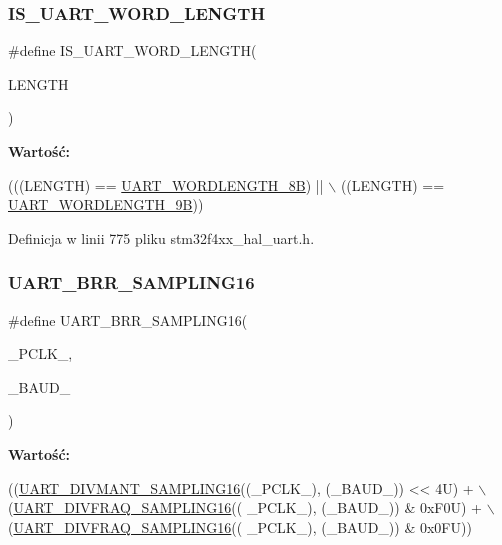 \subsubsection{\texorpdfstring{I\+S\+\_\+\+U\+A\+R\+T\+\_\+\+W\+O\+R\+D\+\_\+\+L\+E\+N\+G\+TH}{IS\_UART\_WORD\_LENGTH}}
{\footnotesize\ttfamily \#define I\+S\+\_\+\+U\+A\+R\+T\+\_\+\+W\+O\+R\+D\+\_\+\+L\+E\+N\+G\+TH(\begin{DoxyParamCaption}\item[{}]{L\+E\+N\+G\+TH }\end{DoxyParamCaption})}

{\bfseries Wartość\+:}
\begin{DoxyCode}
(((LENGTH) == \hyperlink{group___u_a_r_t___word___length_gaf394e9abaf17932ee89591f990fe6407}{UART\_WORDLENGTH\_8B}) || \(\backslash\)
                                     ((LENGTH) == \hyperlink{group___u_a_r_t___word___length_gaf867be43de35fd3c32fe0b4dd4058f7e}{UART\_WORDLENGTH\_9B}))
\end{DoxyCode}


Definicja w linii 775 pliku stm32f4xx\+\_\+hal\+\_\+uart.\+h.

\mbox{\label{group___u_a_r_t___private___macros_gaed98b14acfc939985cc9909a6fa64d71}} 
\subsubsection{\texorpdfstring{U\+A\+R\+T\+\_\+\+B\+R\+R\+\_\+\+S\+A\+M\+P\+L\+I\+N\+G16}{UART\_BRR\_SAMPLING16}}
{\footnotesize\ttfamily \#define U\+A\+R\+T\+\_\+\+B\+R\+R\+\_\+\+S\+A\+M\+P\+L\+I\+N\+G16(\begin{DoxyParamCaption}\item[{}]{\+\_\+\+P\+C\+L\+K\+\_\+,  }\item[{}]{\+\_\+\+B\+A\+U\+D\+\_\+ }\end{DoxyParamCaption})}

{\bfseries Wartość\+:}
\begin{DoxyCode}
((\hyperlink{group___u_a_r_t___private___macros_ga9cd479aff25c454d9d4f3c1c20517c86}{UART\_DIVMANT\_SAMPLING16}((\_PCLK\_), (\_BAUD\_)) << 4U) + \(\backslash\)
                                                        (\hyperlink{group___u_a_r_t___private___macros_gade99ebfd7502df11b366c48fac5417d7}{UART\_DIVFRAQ\_SAMPLING16}((
      \_PCLK\_), (\_BAUD\_)) & 0xF0U) + \(\backslash\)
                                                        (\hyperlink{group___u_a_r_t___private___macros_gade99ebfd7502df11b366c48fac5417d7}{UART\_DIVFRAQ\_SAMPLING16}((
      \_PCLK\_), (\_BAUD\_)) & 0x0FU))
\end{DoxyCode}


